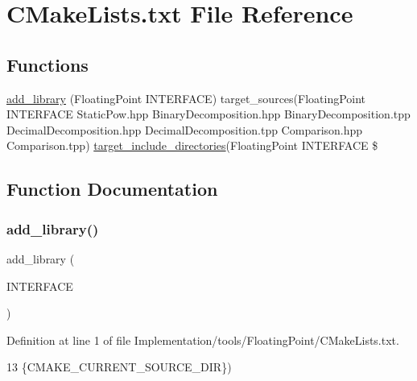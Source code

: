 \hypertarget{Implementation_2tools_2FloatingPoint_2CMakeLists_8txt}{}\section{C\+Make\+Lists.\+txt File Reference}
\label{Implementation_2tools_2FloatingPoint_2CMakeLists_8txt}
\subsection*{Functions}
\begin{DoxyCompactItemize}
\item 
\hyperlink{Implementation_2tools_2FloatingPoint_2CMakeLists_8txt_a9206953aaa61416d084da712d1fe8674}{add\+\_\+library} (Floating\+Point I\+N\+T\+E\+R\+F\+A\+CE) target\+\_\+sources(Floating\+Point I\+N\+T\+E\+R\+F\+A\+CE Static\+Pow.\+hpp Binary\+Decomposition.\+hpp Binary\+Decomposition.\+tpp Decimal\+Decomposition.\+hpp Decimal\+Decomposition.\+tpp Comparison.\+hpp Comparison.\+tpp) \hyperlink{3rd__party_2OCC__dependency_2CMakeLists_8txt_a7716dc48bda2b99d9e8cb80298ce1ce6}{target\+\_\+include\+\_\+directories}(Floating\+Point I\+N\+T\+E\+R\+F\+A\+CE \$
\end{DoxyCompactItemize}


\subsection{Function Documentation}
\mbox{\label{Implementation_2tools_2FloatingPoint_2CMakeLists_8txt_a9206953aaa61416d084da712d1fe8674}} 
\subsubsection{\texorpdfstring{add\+\_\+library()}{add\_library()}}
{\footnotesize\ttfamily add\+\_\+library (\begin{DoxyParamCaption}\item[{Floating\+Point}]{I\+N\+T\+E\+R\+F\+A\+CE }\end{DoxyParamCaption})}



Definition at line 1 of file Implementation/tools/\+Floating\+Point/\+C\+Make\+Lists.\+txt.


\begin{DoxyCode}
13    \{CMAKE\_CURRENT\_SOURCE\_DIR\})
\end{DoxyCode}
